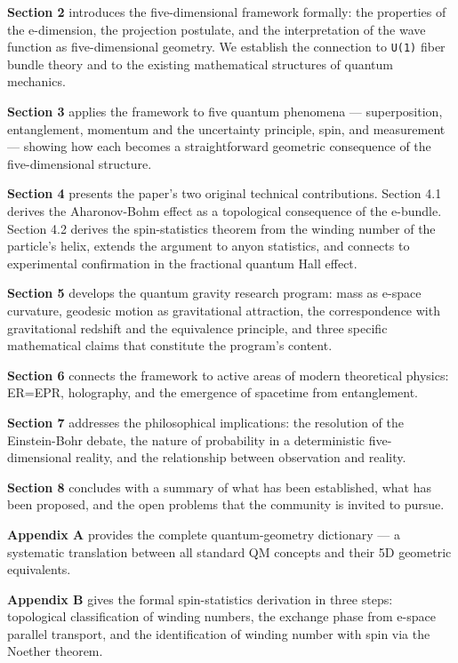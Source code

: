 \documentclass[aps,prd,preprint,superscriptaddress,longbibliography,floatfix]{revtex4-2}
\theoremstyle{remark}
\begin{document}
\textbf{Section 2} introduces the five-dimensional framework formally: the properties of the e-dimension, the projection postulate, and the interpretation of the wave function as five-dimensional geometry. We establish the connection to \texttt{U(1)} fiber bundle theory and to the existing mathematical structures of quantum mechanics.

\textbf{Section 3} applies the framework to five quantum phenomena --- superposition, entanglement, momentum and the uncertainty principle, spin, and measurement --- showing how each becomes a straightforward geometric consequence of the five-dimensional structure.

\textbf{Section 4} presents the paper's two original technical contributions. Section 4.1 derives the Aharonov-Bohm effect as a topological consequence of the e-bundle. Section 4.2 derives the spin-statistics theorem from the winding number of the particle's helix, extends the argument to anyon statistics, and connects to experimental confirmation in the fractional quantum Hall effect.

\textbf{Section 5} develops the quantum gravity research program: mass as e-space curvature, geodesic motion as gravitational attraction, the correspondence with gravitational redshift and the equivalence principle, and three specific mathematical claims that constitute the program's content.

\textbf{Section 6} connects the framework to active areas of modern theoretical physics: ER=EPR, holography, and the emergence of spacetime from entanglement.

\textbf{Section 7} addresses the philosophical implications: the resolution of the Einstein-Bohr debate, the nature of probability in a deterministic five-dimensional reality, and the relationship between observation and reality.

\textbf{Section 8} concludes with a summary of what has been established, what has been proposed, and the open problems that the community is invited to pursue.

\textbf{Appendix A} provides the complete quantum-geometry dictionary --- a systematic translation between all standard QM concepts and their 5D geometric equivalents.

\textbf{Appendix B} gives the formal spin-statistics derivation in three steps: topological classification of winding numbers, the exchange phase from e-space parallel transport, and the identification of winding number with spin via the Noether theorem.
\end{document}
